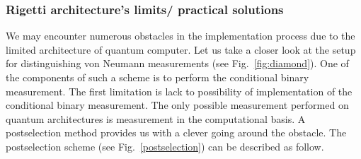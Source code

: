 \documentclass[preprint,12pt, a4paper]{elsarticle}
\newcommand{\1}{{\rm 1\hspace{-0.9mm}l}}
\newcommand{\Id}{{\rm 1\hspace{-0.9mm}l}}
\newcommand{\HH}{\mathcal{H}}
\newcommand{\tr}{\mathrm{tr}}
\begin{document}

%


\subsubsection{Rigetti architecture's limits/ practical solutions}

We may encounter numerous obstacles in the implementation process due to the limited architecture of quantum computer. 
Let us take a closer look at the setup for distinguishing von Neumann 
measurements (see Fig.~\ref{fig:diamond}). One of the components of such a scheme is to perform the conditional binary measurement. The first limitation is lack to possibility of implementation of the conditional binary measurement. The only possible measurement performed on quantum architectures is measurement in the computational basis. 
A postselection method provides us with a clever going around the obstacle. The postselection  scheme (see Fig.~\ref{postselection})  can be described as follow. 
\end{document}
